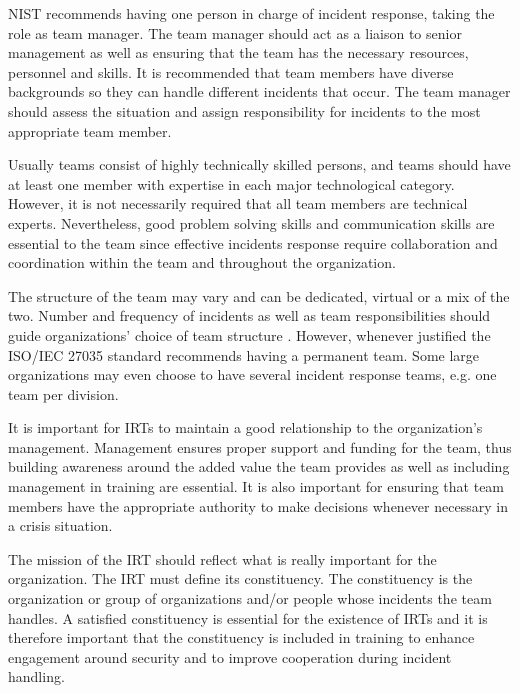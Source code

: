 \ac{NIST} recommends having one person in charge of incident response, taking the role as team manager. The team manager should act as a liaison to senior management as well as ensuring that the team has the necessary resources, personnel and skills. It is recommended that team members have diverse backgrounds so they can handle different incidents that occur. The team manager should assess the situation and assign responsibility for incidents to the most appropriate team member.

Usually teams consist of highly technically skilled persons, and teams should have at least one member with expertise in each major technological category. However, it is not necessarily required that all team members are technical experts. Nevertheless, good problem solving skills and communication skills are essential to the team since effective incidents response require collaboration and coordination within the team and throughout the organization. 

The structure of the team may vary and can be dedicated, virtual or a mix of the two. Number and frequency of incidents as well as team responsibilities should guide organizations' choice of team structure \cite{ISO/IEC27035}. However, whenever justified the ISO/IEC 27035 standard recommends having a permanent team. Some large organizations may even choose to have several incident response teams, e.g. one team per division.

%
It is important for \acp{IRT} to maintain a good relationship to the organization's management. Management ensures proper support and funding for the team, thus building awareness around the added value the team provides as well as including management in training are essential. It is also important for ensuring that team members have the appropriate authority to make decisions whenever necessary in a crisis situation. 

The mission of the \ac{IRT} should reflect what is really important for the organization. The \ac{IRT} must define its constituency. The constituency is the organization or group of organizations and/or people whose incidents the team handles. A satisfied constituency is essential for the existence of \acp{IRT} and it is therefore important that the constituency is included in training to enhance engagement around security and to improve cooperation during incident handling. \cite{enisaGuide}

